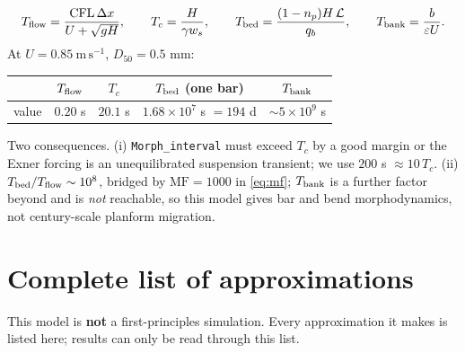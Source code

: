 \documentclass[11pt,a4paper]{article}
\newcommand{\code}[1]{\texttt{\small #1}}
\begin{document}
\begin{equation}
  T_{\rm flow}=\frac{\mathrm{CFL}\,\Delta x}{U+\sqrt{gH}},\qquad
  T_c=\frac{H}{\gamma w_s},\qquad
  T_{\rm bed}=\frac{(1-n_p)H\,\mathcal L}{q_b},\qquad
  T_{\rm bank}=\frac{b}{\varepsilon U}.
\end{equation}
At $U=0.85\ \mathrm{m\,s^{-1}}$, $D_{50}=0.5$ mm:
\begin{center}
\begin{tabular}{lcccc}
\toprule
 & $T_{\rm flow}$ & $T_c$ & $T_{\rm bed}$ (one bar) & $T_{\rm bank}$ \\
\midrule
value & $0.20$ s & $20.1$ s & $1.68\times10^{7}$ s $=194$ d & $\sim5\times10^{9}$ s \\
\bottomrule
\end{tabular}
\end{center}
Two consequences. (i) \code{Morph\_interval} must exceed $T_c$ by a good margin or the
Exner forcing is an unequilibrated suspension transient; we use $200$ s $\approx10\,T_c$.
(ii) $T_{\rm bed}/T_{\rm flow}\sim10^{8}$, bridged by $\mathrm{MF}=1000$ in \eqref{eq:mf};
$T_{\rm bank}$ is a further factor beyond and is \emph{not} reachable, so this model gives
bar and bend morphodynamics, not century-scale planform migration.


\section{Complete list of approximations}
\label{sec:approx}

This model is \textbf{not} a first-principles simulation. Every approximation it makes is
listed here; results can only be read through this list.
\end{document}
